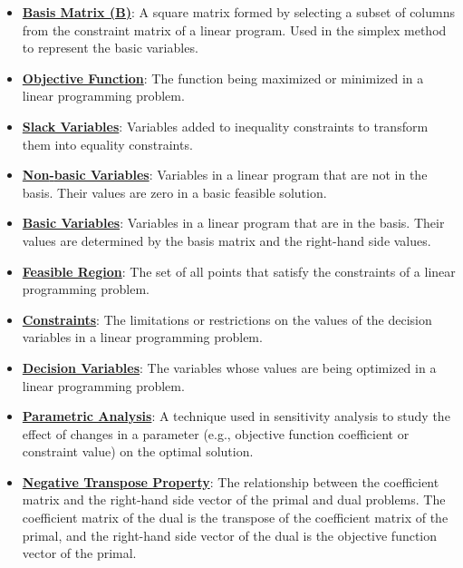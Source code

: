 \documentclass{article}%
\begin{document}
\begin{itemize}[leftmargin=*]
\item \href{https://www.math.purdue.edu/~yipn/421/2024-12-03-Duality.pdf#page=7}{\textbf{Basis Matrix (B)}}: A square matrix formed by selecting a subset of columns from the constraint matrix of a linear program. Used in the simplex method to represent the basic variables. %
\item \href{https://www.math.purdue.edu/~yipn/421/2024-12-03-Duality.pdf#page=1}{\textbf{Objective Function}}: The function being maximized or minimized in a linear programming problem. %
\item \href{https://www.math.purdue.edu/~yipn/421/2024-12-03-Duality.pdf#page=2}{\textbf{Slack Variables}}: Variables added to inequality constraints to transform them into equality constraints. %
\item \href{https://www.math.purdue.edu/~yipn/421/2024-12-03-Duality.pdf#page=2}{\textbf{Non{-}basic Variables}}: Variables in a linear program that are not in the basis. Their values are zero in a basic feasible solution. %
\item \href{https://www.math.purdue.edu/~yipn/421/2024-12-03-Duality.pdf#page=2}{\textbf{Basic Variables}}: Variables in a linear program that are in the basis. Their values are determined by the basis matrix and the right-hand side values. %
\item \href{https://www.math.purdue.edu/~yipn/421/2024-12-03-Duality.pdf#page=3}{\textbf{Feasible Region}}: The set of all points that satisfy the constraints of a linear programming problem. %
\item \href{https://www.math.purdue.edu/~yipn/421/2024-12-03-Duality.pdf#page=1}{\textbf{Constraints}}: The limitations or restrictions on the values of the decision variables in a linear programming problem. %
\item \href{https://www.math.purdue.edu/~yipn/421/2024-12-03-Duality.pdf#page=1}{\textbf{Decision Variables}}: The variables whose values are being optimized in a linear programming problem. %
\item \href{https://www.math.purdue.edu/~yipn/421/2024-12-03-Duality.pdf#page=4}{\textbf{Parametric Analysis}}: A technique used in sensitivity analysis to study the effect of changes in a parameter (e.g., objective function coefficient or constraint value) on the optimal solution. %
\item \href{https://www.math.purdue.edu/~yipn/421/2024-12-03-Duality.pdf#page=5}{\textbf{Negative Transpose Property}}: The relationship between the coefficient matrix and the right-hand side vector of the primal and dual problems. The coefficient matrix of the dual is the transpose of the coefficient matrix of the primal, and the right-hand side vector of the dual is the objective function vector of the primal. %

\end{itemize}
\end{document}
